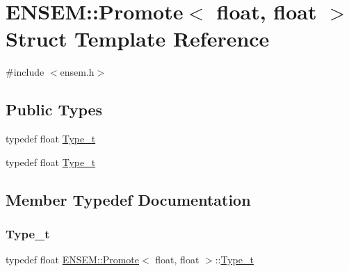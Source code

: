 \hypertarget{structENSEM_1_1Promote_3_01float_00_01float_01_4}{}\section{E\+N\+S\+EM\+:\+:Promote$<$ float, float $>$ Struct Template Reference}
\label{structENSEM_1_1Promote_3_01float_00_01float_01_4}


{\ttfamily \#include $<$ensem.\+h$>$}

\subsection*{Public Types}
\begin{DoxyCompactItemize}
\item 
typedef float \mbox{\hyperlink{structENSEM_1_1Promote_3_01float_00_01float_01_4_a27610700459f91acb939a75fd84c4d76}{Type\+\_\+t}}
\item 
typedef float \mbox{\hyperlink{structENSEM_1_1Promote_3_01float_00_01float_01_4_a27610700459f91acb939a75fd84c4d76}{Type\+\_\+t}}
\end{DoxyCompactItemize}


\subsection{Member Typedef Documentation}
\mbox{\label{structENSEM_1_1Promote_3_01float_00_01float_01_4_a27610700459f91acb939a75fd84c4d76}} 
\subsubsection{\texorpdfstring{Type\_t}{Type\_t}\hspace{0.1cm}{\footnotesize\ttfamily [1/2]}}
{\footnotesize\ttfamily typedef float \mbox{\hyperlink{structENSEM_1_1Promote}{E\+N\+S\+E\+M\+::\+Promote}}$<$ float, float $>$\+::\mbox{\hyperlink{structENSEM_1_1Promote_3_01float_00_01float_01_4_a27610700459f91acb939a75fd84c4d76}{Type\+\_\+t}}}

\mbox{\label{structENSEM_1_1Promote_3_01float_00_01float_01_4_a27610700459f91acb939a75fd84c4d76}} 
